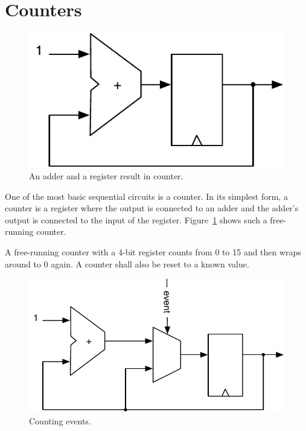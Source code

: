 \documentclass[%
    10pt,
    headinclude, footexclude,
    openright, %
    notitlepage,
    cleardoubleempty,
    headsepline,
    pointlessnumbers,
    bibtotoc, idxtotoc,
    ]{scrbook}
\newcommand{\scale}{0.7}
\begin{document}
\section{Counters}
\label{sec:counter}

\begin{figure}
  \centering
  \includegraphics[scale=\scale]{figures/counter}
  \caption{An adder and a register result in counter.}
  \label{fig:counter}
\end{figure}

One of the most basic sequential circuits is a counter. In its simplest form, a counter is a register
where the output is connected to an adder and the adder's output is connected to the input
of the register. Figure~\ref{fig:counter} shows such a free-running counter.

A free-running counter with a 4-bit register counts from 0 to 15 and then wraps around
to 0 again. A counter shall also be reset to a known value.


\begin{figure}
  \centering
  \includegraphics[scale=\scale]{figures/event-counter}
  \caption{Counting events.}
  \label{fig:event-counter}
\end{figure}
\end{document}
